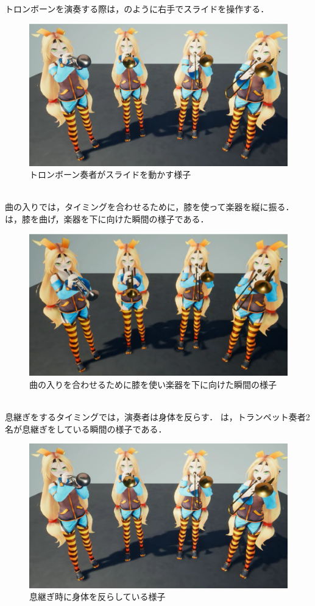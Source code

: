 \newpage
トロンボーンを演奏する際は，のように右手でスライドを操作する．
\begin{figure}[h]
	\centering
	\includegraphics[width=13cm]{fig/chap4/anim2_slide.eps}
	\caption{トロンボーン奏者がスライドを動かす様子}
	\label{fig:anim2_slide}
\end{figure}
\\
曲の入りでは，タイミングを合わせるために，膝を使って楽器を縦に振る．
は，膝を曲げ，楽器を下に向けた瞬間の様子である．
\begin{figure}[h]
	\centering
	\includegraphics[width=13cm]{fig/chap4/anim2_down.eps}
	\caption{曲の入りを合わせるために膝を使い楽器を下に向けた瞬間の様子}
	\label{fig:anim2_down}
\end{figure}
\\
息継ぎをするタイミングでは，演奏者は身体を反らす．
は，トランペット奏者2名が息継ぎをしている瞬間の様子である．
\begin{figure}[h]
	\centering
	\includegraphics[width=13cm]{fig/chap4/anim2_breath.eps}
	\caption{息継ぎ時に身体を反らしている様子}
	\label{fig:anim2_breath}
\end{figure}
\newpage

